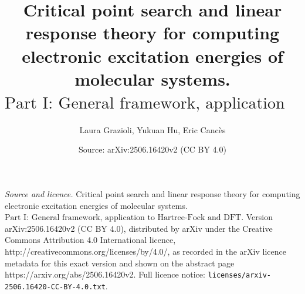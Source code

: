\documentclass[10pt,a4paper]{amsart}
\title{Critical point search and linear response theory for computing electronic excitation energies of molecular systems. \\ $\mbox{Part I: General framework, application to Hartree-Fock and DFT}$}
\author{Laura Grazioli, Yukuan Hu, Eric Canc\`es}
\date{Source: arXiv:2506.16420v2 (CC BY 4.0)}
\begin{document}
\maketitle

\noindent\emph{Source and licence.} Critical point search and linear response theory for computing electronic excitation energies of molecular systems. \\ $\mbox{Part I: General framework, application to Hartree-Fock and DFT}$. Version arXiv:2506.16420v2 (CC BY 4.0), distributed by arXiv under the Creative Commons Attribution 4.0 International licence, http://creativecommons.org/licenses/by/4.0/, as recorded in the arXiv licence metadata for this exact version and shown on the abstract page https://arxiv.org/abs/2506.16420v2. Full licence notice: \texttt{licenses/arxiv-2506.16420-CC-BY-4.0.txt}.\par\smallskip
\end{document}
